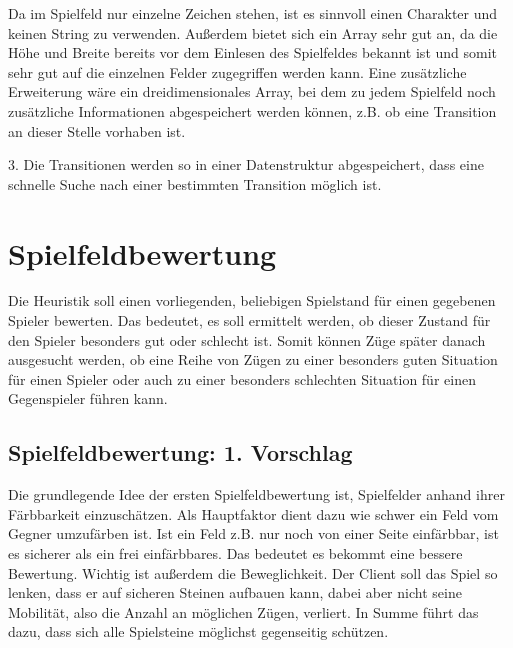 \documentclass[12pt,a4paper,bibliography=totocnumbered,listof=totocnumbered]{scrartcl}
\begin{document}
    Da im Spielfeld nur einzelne Zeichen stehen, ist es sinnvoll einen Charakter und keinen String zu verwenden. Außerdem bietet sich ein Array sehr gut an, da die Höhe und Breite bereits vor dem Einlesen des Spielfeldes bekannt ist und somit sehr gut auf die einzelnen Felder zugegriffen werden kann.
    Eine zusätzliche Erweiterung wäre ein dreidimensionales Array, bei dem zu jedem Spielfeld noch zusätzliche Informationen abgespeichert werden können, z.B. ob eine Transition an dieser Stelle vorhaben ist.

    3. Die Transitionen werden so in einer Datenstruktur abgespeichert, dass eine schnelle Suche nach einer bestimmten Transition möglich ist.


    \newpage
    \section{Spielfeldbewertung}
    \vspace{1em}
    Die Heuristik soll einen vorliegenden, beliebigen Spielstand für einen gegebenen Spieler bewerten. Das bedeutet, es soll ermittelt werden, ob dieser Zustand für den Spieler besonders gut oder schlecht ist. Somit können Züge später danach ausgesucht werden, ob eine Reihe von Zügen zu einer besonders guten Situation für einen Spieler oder auch zu einer besonders schlechten Situation für einen Gegenspieler führen kann.
    
    \subsection{Spielfeldbewertung: 1. Vorschlag}
    \vspace{1em}
	Die grundlegende Idee der ersten Spielfeldbewertung ist, Spielfelder anhand ihrer \glqq Färbbarkeit\grqq{} einzuschätzen. Als Hauptfaktor dient dazu wie schwer ein Feld vom Gegner umzufärben ist. Ist ein Feld z.B. nur noch von einer Seite einfärbbar, ist es sicherer als ein frei einfärbbares. Das bedeutet es bekommt eine bessere Bewertung. Wichtig ist außerdem die Beweglichkeit. Der Client soll das Spiel so lenken, dass er auf sicheren Steinen aufbauen kann, dabei aber nicht seine Mobilität, also die Anzahl an möglichen Zügen, verliert. In Summe führt das dazu, dass sich alle Spielsteine möglichst gegenseitig schützen.
\end{document}
